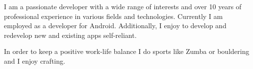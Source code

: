 

\begin{cvparagraph}

I am a passionate developer with a wide range of interests and over 10 years of professional experience in various fields and 
technologies. Currently I am employed as a developer for Android. Additionally, I enjoy to develop and redevelop new and existing apps self-reliant. 

In order to keep a positive work-life balance I do sports like Zumba or bouldering and I enjoy crafting.
\end{cvparagraph}
